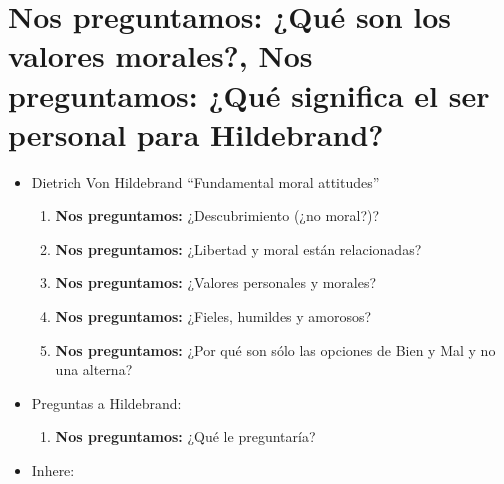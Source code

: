 \section{\textbf{Nos preguntamos:} ¿Qué son los valores morales?, \textbf{Nos preguntamos:} ¿Qué significa el \textbf{ser personal} para Hildebrand?}
\begin{itemize}
    \item Dietrich Von Hildebrand ``Fundamental moral attitudes''
        \begin{enumerate}
            \item \textbf{Nos preguntamos:} ¿Descubrimiento (¿no moral?)?
            \item \textbf{Nos preguntamos:} ¿Libertad y moral están relacionadas?
            \item \textbf{Nos preguntamos:} ¿Valores personales y morales?
            \item \textbf{Nos preguntamos:} ¿Fieles, humildes y amorosos?
            \item \textbf{Nos preguntamos:} ¿Por qué son sólo las opciones de Bien y Mal y no una alterna?
        \end{enumerate}
    
    \item Preguntas a Hildebrand:
        \begin{enumerate}
            \item \textbf{Nos preguntamos:} ¿Qué le preguntaría?
        \end{enumerate}

    \item Inhere:
    

\end{itemize}
